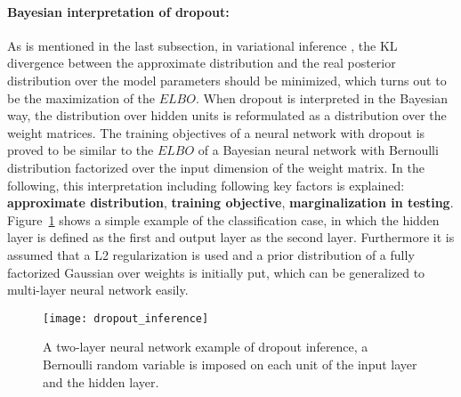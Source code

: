 \paragraph{Bayesian interpretation of dropout:}
As is mentioned in the last subsection, in variational inference , the KL divergence between the approximate distribution and the real posterior distribution over the model parameters should be minimized, which turns out to be the maximization of the $ELBO$. When dropout is interpreted in the Bayesian way, the distribution over hidden units is reformulated as a distribution over the weight matrices. The training objectives of a neural network with dropout is proved to be similar to the $ELBO$ of a Bayesian neural network with Bernoulli distribution factorized over the input dimension of the weight matrix. In the following, this interpretation including following key factors is explained: \textbf{approximate distribution}, \textbf{training objective}, \textbf{marginalization in testing}. 
Figure~\ref{fig:dropout_inference} shows a simple example of the {classification} case, in which the hidden layer is defined as the first and output layer as the second layer. Furthermore it is assumed that a L2 regularization is used and a prior distribution of a fully factorized Gaussian over weights is initially put, which can be generalized to multi-layer neural network easily.

\begin{figure}[h!]
	\centering
	\texttt{[image: dropout\_inference]}
	\caption{A two-layer neural network example of dropout inference, a Bernoulli random variable is imposed on each unit of the input layer and the hidden layer.}		
	\label{fig:dropout_inference}
\end{figure}

